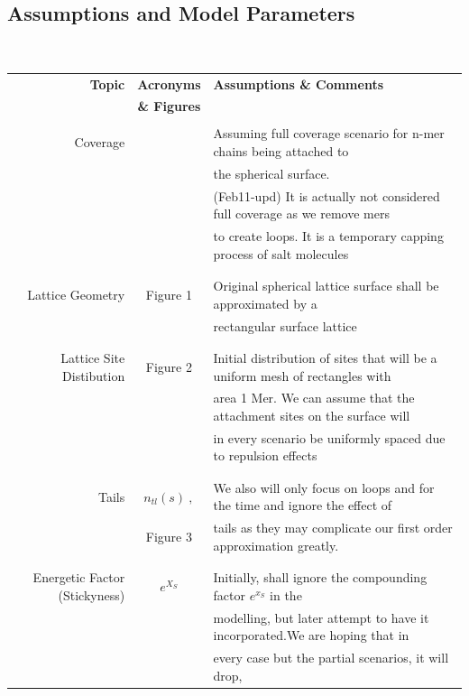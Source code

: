 \documentclass[10pt,letterpaper]{article}
\begin{document}
\subsection{Assumptions and Model Parameters}
\textbf{}\\
\begin{center}
\begin{tabular}{r|c|l}
	\textbf{Topic} & \textbf{Acronyms} & \textbf{Assumptions \& Comments} \\ 
	&\textbf{\& Figures}&\\
	\hline
	&&\\
	Coverage&  &Assuming full coverage scenario for n-mer chains being attached to\\ &&the spherical surface. \\ &&(Feb11-upd) It is actually not considered full coverage as we remove mers\\ &&to create loops. It is a temporary capping process of salt molecules\\
	&&\\
	\hline
	&&\\ 	
	Lattice Geometry& Figure 1 & Original spherical lattice surface shall be approximated by a\\ &&rectangular surface lattice\\
	&&\\
	\hline
	&&\\ 
	Lattice Site Distibution& Figure 2 & Initial distribution of sites that will be a uniform mesh of rectangles with\\ &&area 1 Mer. We can assume that the attachment sites on the surface will\\ &&in every scenario be uniformly spaced due to repulsion effects \\
	&&\\
	\hline
	&&\\ 
	Tails& $n_{tl}(s)~,$&We also will only focus on loops and for the time and ignore the effect of\\ &Figure 3&tails as they may complicate our first order approximation greatly.\\
	&&\\
	\hline
	&&\\ 
	Energetic Factor (Stickyness)& $e^{X_{S}}$&  Initially, shall ignore the compounding factor $e^{x_S}$ in the \\ &&modelling, but later attempt to have it incorporated.We are hoping that in\\ &&every case but the partial scenarios, it will drop,\\

\end{tabular}
\end{center}
\end{document}
